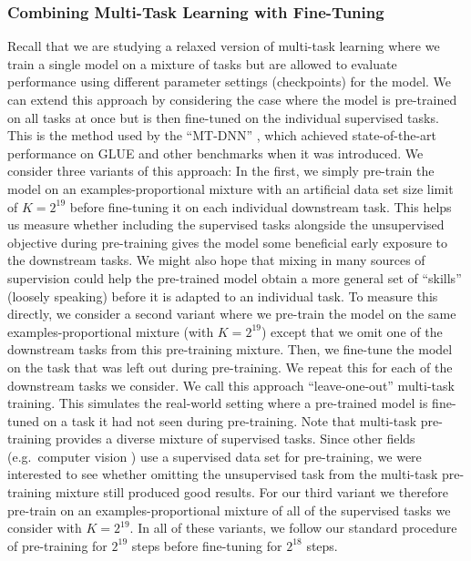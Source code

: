 \documentclass[twoside,11pt]{article}
\begin{document}
\subsubsection{Combining Multi-Task Learning with Fine-Tuning}
\label{sec:mtft}

Recall that we are studying a relaxed version of multi-task learning where we train a single model on a mixture of tasks but are allowed to evaluate performance using different parameter settings (checkpoints) for the model.
We can extend this approach by considering the case where the model is pre-trained on all tasks at once but is then fine-tuned on the individual supervised tasks.
This is the method used by the ``MT-DNN'' \citep{liu2015representation,liu2019multi}, which achieved state-of-the-art performance on GLUE and other benchmarks when it was introduced.
We consider three variants of this approach:
In the first, we simply pre-train the model on an examples-proportional mixture with an artificial data set size limit of $K=2^{19}$ before fine-tuning it on each individual downstream task.
This helps us measure whether including the supervised tasks alongside the unsupervised objective during pre-training gives the model some beneficial early exposure to the downstream tasks.
We might also hope that mixing in many sources of supervision could help the pre-trained model obtain a more general set of ``skills'' (loosely speaking) before it is adapted to an individual task.
To measure this directly, we consider a second variant where we pre-train the model on the same examples-proportional mixture (with $K=2^{19}$) except that we omit one of the downstream tasks from this pre-training mixture.
Then, we fine-tune the model on the task that was left out during pre-training.
We repeat this for each of the downstream tasks we consider.
We call this approach ``leave-one-out'' multi-task training.
This simulates the real-world setting where a pre-trained model is fine-tuned on a task it had not seen during pre-training.
Note that multi-task pre-training provides a diverse mixture of supervised tasks.
Since other fields (e.g.\ computer vision \citep{oquab2014learning,jia2014caffe,huh2016makes,yosinski2014transferable}) use a supervised data set for pre-training, we were interested to see whether omitting the unsupervised task from the multi-task pre-training mixture still produced good results.
For our third variant we therefore pre-train on an examples-proportional mixture of all of the supervised tasks we consider with $K = 2^{19}$.
In all of these variants, we follow our standard procedure of pre-training for $2^{19}$ steps before fine-tuning for $2^{18}$ steps.
\end{document}
